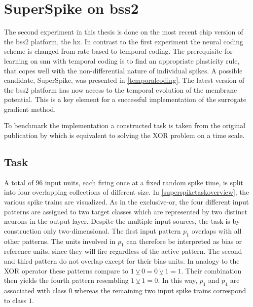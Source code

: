 \chapter{SuperSpike on \acrshort{bss2}}
\label{superspike}
The second experiment in this thesis is done on the most recent chip version of the \gls{bss2} platform, the \gls{hx}. In contrast to the first experiment the neural coding scheme is changed from rate based to temporal coding. The prerequisite for learning on \gls{snn} with temporal coding is to find an appropriate plasticity rule, that copes well with the non-differential nature of individual spikes. A possible candidate, SuperSpike, was presented in \cref{temporalcoding}. The latest version of the \gls{bss2} platform has now access to the temporal evolution of the membrane potential. This is a key element for a successful implementation of the surrogate gradient method.

To benchmark the implementation a constructed task is taken from the original publication by \cite{zenke2018superspike} which is equivalent to solving the XOR problem on a time scale.

\section{Task}
A total of 96 input units, each firing once at a fixed random spike time, is split into four overlapping collections of different size. In \cref{superspiketaskoverview}, the various spike trains are visualized. As in the exclusive-or, the four different input patterns are assigned to two target classes which are represented by two distinct neurons in the output layer. Despite the multiple input sources, the task is by construction only two-dimensional. The first input pattern $p_1$ overlaps with all other patterns. The units involved in $p_1$ can therefore be interpreted as bias or reference units, since they will fire regardless of the active pattern. The second and third pattern do not overlap except for their bias units. In analogy to the XOR operator these patterns compare to $1 \veebar 0 = 0 \veebar 1 = 1$. Their combination then yields the fourth pattern resembling $1 \veebar 1 = 0$. In this way, $p_1$ and $p_4$ are associated with class $0$ whereas the remaining two input spike trains correspond to class $1$. 

